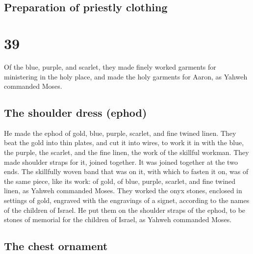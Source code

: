 \hypertarget{preparation-of-priestly-clothing}{%
\subsection{Preparation of priestly
clothing}\label{preparation-of-priestly-clothing}}

\hypertarget{section-38}{%
\section{39}\label{section-38}}

 Of the blue, purple, and scarlet, they made finely worked
garments for ministering in the holy place, and made the holy garments
for Aaron, as Yahweh commanded Moses.

\hypertarget{the-shoulder-dress-ephod-1}{%
\subsection{The shoulder dress
(ephod)}\label{the-shoulder-dress-ephod-1}}

 He made the ephod of gold, blue, purple, scarlet, and
fine twined linen.  They beat the gold into thin plates,
and cut it into wires, to work it in with the blue, the purple, the
scarlet, and the fine linen, the work of the skillful workman.
 They made shoulder straps for it, joined together. It was
joined together at the two ends.  The skillfully woven
band that was on it, with which to fasten it on, was of the same piece,
like its work: of gold, of blue, purple, scarlet, and fine twined linen,
as Yahweh commanded Moses.  They worked the onyx stones,
enclosed in settings of gold, engraved with the engravings of a signet,
according to the names of the children of Israel.  He put
them on the shoulder straps of the ephod, to be stones of memorial for
the children of Israel, as Yahweh commanded Moses.

\hypertarget{the-chest-ornament}{%
\subsection{The chest ornament}\label{the-chest-ornament}}

